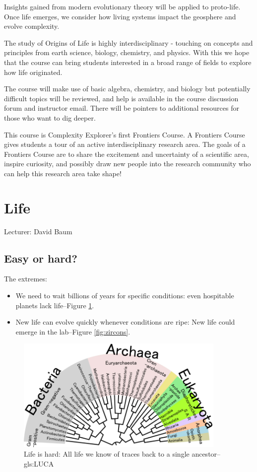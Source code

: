\documentclass[]{article}
\begin{document}
Insights gained from modern evolutionary theory will be applied to proto-life. Once life emerges, we consider how living systems impact the geosphere and evolve complexity. 

The study of Origins of Life is highly interdisciplinary - touching on concepts and principles from earth science, biology, chemistry, and physics.  With this we hope that the course can bring students interested in a broad range of fields to explore how life originated. 

The course will make use of basic algebra, chemistry, and biology but potentially difficult topics will be reviewed, and help is available in the course discussion forum and instructor email. There will be pointers to additional resources for those who want to dig deeper.

This course is Complexity Explorer's first Frontiers Course.  A Frontiers Course gives students a tour of an active interdisciplinary research area. The goals of a Frontiers Course are to share the excitement and uncertainty of a scientific area, inspire curiosity, and possibly draw new people into the research community who can help this research area take shape!

\section{Life}
Lecturer: David Baum
\subsection{Easy or hard?}
The extremes:
\begin{itemize}
	\item We need to wait billions of years for specific conditions: even hospitable planets lack life--Figure \ref{fig:luca}.
	\item New life can evolve quickly whenever conditions are ripe:  New life could emerge in the lab--Figure \ref{fig:zircons}.
\end{itemize}

\begin{figure}[H]
	\caption{Life is hard: All life we know of traces back to a single 		ancestor--\gls{gls:LUCA}}\label{fig:luca} 
	\includegraphics[width=0.9\textwidth]{Luca}
\end{figure}
\end{document}

